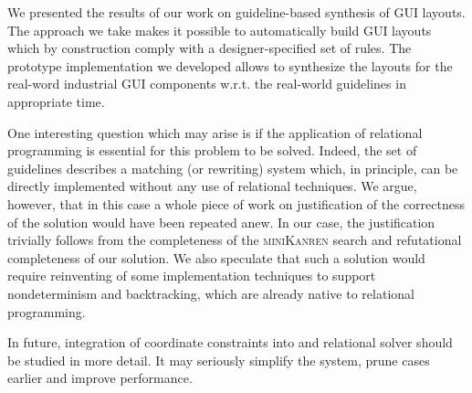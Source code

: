 
We presented the results of our work on guideline-based synthesis of GUI layouts. The approach we take makes it possible to
automatically build GUI layouts which by construction comply with a designer-specified set of rules. The prototype implementation
we developed allows to synthesize the layouts for the real-word industrial GUI components w.r.t. the real-world guidelines in
appropriate time.

One interesting question which may arise is if the application of relational programming is essential for this problem to be solved. Indeed, the set of guidelines
describes a matching (or rewriting) system which, in principle, can be directly implemented without any use of relational techniques. We argue, however,
that in this case a whole piece of work on justification of the correctness of the solution would have been repeated anew. In our
case, the justification trivially follows from the completeness of the \textsc{miniKanren} search and refutational completeness of our solution.
We also speculate that such a solution would require reinventing of some implementation techniques to support nondeterminism and backtracking, which are already native to relational programming.

In future, integration of coordinate constraints into \OCanren{} and relational solver should be studied in more detail.
It may seriously simplify the system, prune cases earlier and improve performance.
